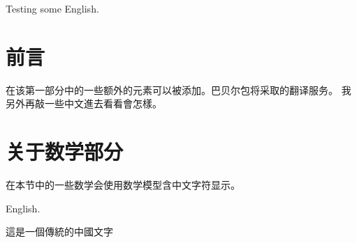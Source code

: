 \documentclass[a4paper,12pt]{article}
\begin{document}
 
 
Testing some English.

\section{前言}
在该第一部分中的一些额外的元素可以被添加。巴贝尔包将采取的翻译服务。 我另外再敲一些中文進去看看會怎樣。
 
\section{关于数学部分}
在本节中的一些数学会使用数学模型含中文字符显示。

English.
 
\vspace{0.5cm}
 
這是一個傳統的中國文字
\end{document}
